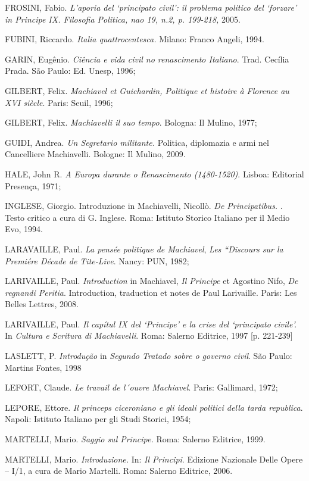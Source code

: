 FROSINI, Fabio. \emph{L'aporia del `principato civil': il problema
politico del `forzare' in Principe IX. Filosofia Politica, nao 19, n.2,
p. 199-218,} 2005.

FUBINI, Riccardo. \emph{Italia quattrocentesca.} Milano: Franco Angeli,
1994.

GARIN, Eugênio. \emph{Ciência e vida civil no renascimento Italiano}.
Trad. Cecília Prada. São Paulo: Ed. Unesp, 1996;

GILBERT, Felix. \emph{Machiavel et Guichardin, Politique et histoire à
Florence au XVI siècle}. Paris: Seuil, 1996;

GILBERT, Felix. \emph{Machiavelli il suo tempo}. Bologna: Il Mulino,
1977;

GUIDI, Andrea. \emph{Un Segretario militante.} Politica, diplomazia e
armi nel Cancelliere Machiavelli. Bologne: Il Mulino, 2009.

HALE, John R. \emph{A Europa durante o Renascimento (1480-1520)}.
Lisboa: Editorial Presença, 1971;

INGLESE, Giorgio. Introduzione in Machiavelli, Nicollò. \emph{De
Principatibus.} . Testo critico a cura di G. Inglese. Roma: Istituto
Storico Italiano per il Medio Evo, 1994.

LARAVAILLE, Paul. \emph{La pensée politique de Machiavel}, \emph{Les
``Discours sur la Premiére Décade de Tite-Live}. Nancy: PUN, 1982;

LARIVAILLE, Paul. \emph{Introduction} in Machiavel, \emph{Il Principe}
et Agostino Nifo, \emph{De regnandi Peritia}. Introduction, traduction
et notes de Paul Larivaille. Paris: Les Belles Lettres, 2008.

LARIVAILLE, Paul. \emph{Il capítul IX del `Principe' e la crise del
`principato civile'.} In \emph{Cultura e Scritura di Machiavelli}. Roma:
Salerno Editrice, 1997 {[}p. 221-239{]}

LASLETT, P. \emph{Introdução} in \emph{Segundo Tratado sobre o governo
civil}. São Paulo: Martins Fontes, 1998

LEFORT, Claude. \emph{Le travail de l´ouvre Machiavel}. Paris:
Gallimard, 1972;

LEPORE, Ettore. \emph{Il princeps ciceroniano e gli ideali politici
della tarda republica}. Napoli: Istituto Italiano per gli Studi Storici,
1954;

MARTELLI, Mario. \emph{Saggio sul Principe.} Roma: Salerno Editrice,
1999.

MARTELLI, Mario. \emph{Introduzione.} In: \emph{Il Principi}. Edizione
Nazionale Delle Opere -- I/1, a cura de Mario Martelli. Roma: Salerno
Editrice, 2006.

